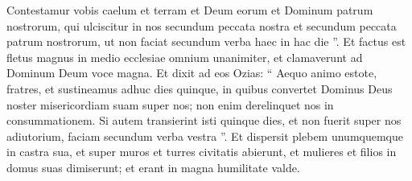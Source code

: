 \begin{biblechapter}
\begin{biblechapter}
\begin{biblechapter}
\begin{biblechapter}
\begin{biblechapter}
\begin{biblechapter}
\begin{biblechapter}
 \verse Contestamur vobis caelum et terram et Deum eorum et Dominum patrum nostrorum, qui ulciscitur in nos secundum peccata nostra et secundum peccata patrum nostrorum, ut non faciat secundum verba haec in hac die ”. 
\verse Et factus est fletus magnus in medio ecclesiae omnium unanimiter, et clamaverunt ad Dominum Deum voce magna.
 \verse Et dixit ad eos Ozias: “ Aequo animo estote, fratres, et sustineamus adhuc dies quinque, in quibus convertet Dominus Deus noster misericordiam suam super nos; non enim derelinquet nos in consummationem. 
\verse Si autem transierint isti quinque dies, et non fuerit super nos adiutorium, faciam secundum verba vestra ”. 
\verse Et dispersit plebem unumquemque in castra sua, et super muros et turres civitatis abierunt, et mulieres et filios in domus suas dimiserunt; et erant in magna humilitate valde.
 

\end{biblechapter}
\end{biblechapter}
\end{biblechapter}
\end{biblechapter}
\end{biblechapter}
\end{biblechapter}
\end{biblechapter}
